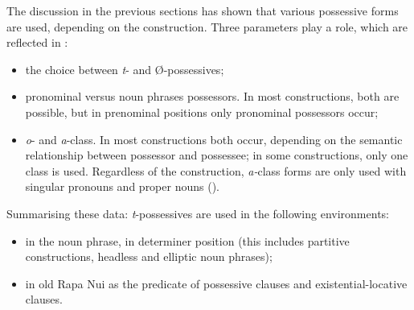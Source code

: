 
The discussion in the previous sections has shown that various possessive forms are used, depending on the construction. Three parameters play a role, which are reflected in :

\begin{itemize}
\item 
the choice between \textit{t}{}- and Ø-possessives;

\item 
pronominal versus noun phrases possessors. In most constructions, both are possible, but in prenominal positions only pronominal possessors occur; 

\item 
\textit{o}{}- and \textit{a}{}-class. In most constructions both occur, depending on the semantic relationship between possessor and possessee; in some constructions, only one class is used. Regardless of the construction, \textit{a-}class forms are only used with singular pronouns and proper nouns ().

\end{itemize}

Summarising these data: \textit{t}{}-possessives are used in the following environments:

\begin{itemize}
\item 
in the noun phrase, in determiner position (this includes partitive constructions, headless and elliptic noun phrases);

\item 
in old Rapa Nui as the predicate of possessive clauses and existential-locative clauses.

\end{itemize}

